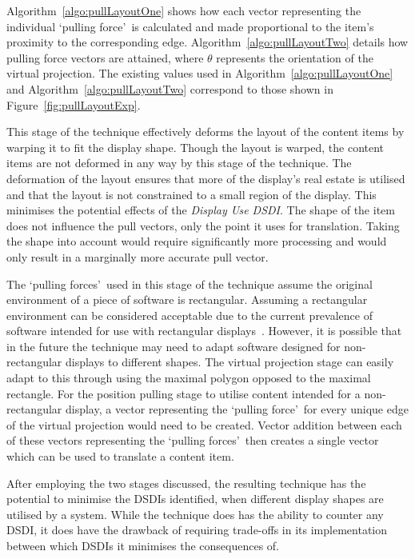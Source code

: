 \documentclass{bmcart}
\begin{document}

Algorithm~\ref{algo:pullLayoutOne} shows how each vector representing the individual \lq pulling force\rq\ is calculated and made proportional to the item's proximity to the corresponding edge.
Algorithm~\ref{algo:pullLayoutTwo} details how pulling force vectors are attained, where $\theta$ represents the orientation of the virtual projection.
The existing values used in Algorithm~\ref{algo:pullLayoutOne} and Algorithm~\ref{algo:pullLayoutTwo} correspond to those shown in Figure~\ref{fig:pullLayoutExp}.

This stage of the technique effectively deforms the layout of the content items by warping it to fit the display shape.
Though the layout is warped, the content items are not deformed in any way by this stage of the technique.
The deformation of the layout ensures that more of the display's real estate is utilised and that the layout is not constrained to a small region of the display.
This minimises the potential effects of the {\emph{Display Use \ac{DSDI}}}.
The shape of the item does not influence the pull vectors, only the point it uses for translation.
Taking the shape into account would require significantly more processing and would only result in a marginally more accurate pull vector.

The \lq pulling forces\rq\ used in this stage of the technique assume the original environment of a piece of software is rectangular.
Assuming a rectangular environment can be considered acceptable due to the current prevalence of software intended for use with rectangular displays~\cite{VanDam2001}.
However, it is possible that in the future the technique may need to adapt software designed for non-rectangular displays to different shapes.
The virtual projection stage can easily adapt to this through using the maximal polygon opposed to the maximal rectangle.
For the position pulling stage to utilise content intended for a non-rectangular display, a vector representing the \lq pulling force\rq\ for every unique edge of the virtual projection would need to be created.
Vector addition between each of these vectors representing the \lq pulling forces\rq\ then creates a single vector which can be used to translate a content item.

After employing the two stages discussed, the resulting technique has the potential to minimise the \acp{DSDI} identified, when different display shapes are utilised by a system. 
While the technique does has the ability to counter any \ac{DSDI}, it does have the drawback of requiring trade-offs in its implementation between which \acp{DSDI} it minimises the consequences of.
\end{document}
